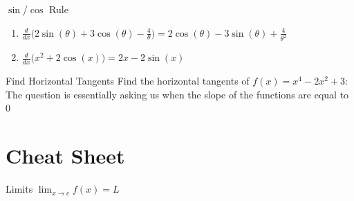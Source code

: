 \documentclass{MathNotes}
\begin{document}
\begin{example}{$\sin$/$\cos$ Rule}
    \begin{enumerate}
        \item $\frac{d}{dx}
            \bigl(2\sin(\theta)+3\cos(\theta)-\frac{4}{\theta}\bigr)=
            2\cos(\theta)-3\sin(\theta)+\frac{4}{\theta^2}
            $
        \item $\frac{d}{dx}\bigl(x^2+2\cos(x)\bigr)=2x-2\sin(x)$
    \end{enumerate}
\end{example}

\begin{example}{Find Horizontal Tangents}
    Find the horizontal tangents of $f(x)=x^4-2x^2+3$:
    \br
    The question is essentially asking us when the slope of the functions are
    equal to 0
\end{example}

\newpage
\section{Cheat Sheet}
\begin{multicols}{2}
    \begin{GrayBox}{Limits}{}
        $\lim_{x\to c}f(x)=L$
    \end{GrayBox}
\end{multicols}
\end{document}
